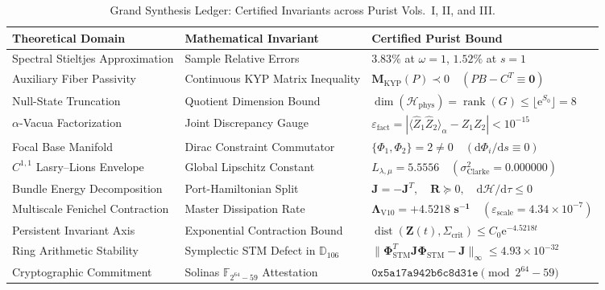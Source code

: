 \documentclass[11pt,a4paper,reqno]{article}
\theoremstyle{plain}
\theoremstyle{definition}
\theoremstyle{remark}
\numberwithin{equation}{section}
\newcommand{\Hphys}{\mathcal{H}_{\mathrm{phys}}}
\newcommand{\Zop}{\widehat{Z}}
\providecommand{\diff}{\mathrm{d}}
\begin{document}
\begin{table}[H]
\centering
\small
\caption{Grand Synthesis Ledger: Certified Invariants across Purist Vols.~I, II, and III.}
\label{tab:synthesis_ledger_master}
\vspace{0.4em}
\begin{tabular}{>{\raggedright\arraybackslash}p{4.8cm}
                >{\raggedright\arraybackslash}p{4.6cm}
                >{\raggedright\arraybackslash}p{5.4cm}}
\toprule
\textbf{Theoretical Domain} & \textbf{Mathematical Invariant} & \textbf{Certified Purist Bound} \\
\midrule
Spectral Stieltjes Approximation & Sample Relative Errors & $3.83\%$ at $\omega=1$, $1.52\%$ at $s=1$ \\
Auxiliary Fiber Passivity & Continuous KYP Matrix Inequality & $\mathbf{M}_{\mathrm{KYP}}(P) \prec 0 \quad (P B - C^T \equiv \bm{0})$ \\
Null-State Truncation & Quotient Dimension Bound & $\dim(\Hphys) = \operatorname{rank}(G) \le \lfloor \mathrm{e}^{S_0} \rfloor = 8$ \\
$\alpha$-Vacua Factorization & Joint Discrepancy Gauge & $\varepsilon_{\mathrm{fact}} = |\langle \Zop_1 \Zop_2 \rangle_\alpha - Z_1 Z_2| < 10^{-15}$ \\
Focal Base Manifold & Dirac Constraint Commutator & $\{\Phi_1, \Phi_2\} = 2 \ne 0 \quad (\diff\Phi_i/\diff s \equiv 0)$ \\
$C^{1,1}$ Lasry--Lions Envelope & Global Lipschitz Constant & $L_{\lambda,\mu} = 5.5556 \quad (\sigma_{\mathrm{Clarke}}^2 = 0.000000)$ \\
Bundle Energy Decomposition & Port-Hamiltonian Split & $\mathbf{J} = -\mathbf{J}^T, \quad \mathbf{R} \succeq 0, \quad \diff\mathcal{H}/\diff\tau \le 0$ \\
Multiscale Fenichel Contraction & Master Dissipation Rate & $\mathbf{\Lambda_{\mathrm{V10}} = +4.5218\text{ s}^{-1}} \quad (\varepsilon_{\mathrm{scale}} = 4.34 \times 10^{-7})$ \\
Persistent Invariant Axis & Exponential Contraction Bound & $\operatorname{dist}(\bm{Z}(t), \Sigma_{\mathrm{crit}}) \le C_0 \mathrm{e}^{-4.5218 t}$ \\
Ring Arithmetic Stability & Symplectic STM Defect in $\mathbb{D}_{106}$ & $\|\bm{\Phi}_{\mathrm{STM}}^T \mathbf{J} \bm{\Phi}_{\mathrm{STM}} - \mathbf{J}\|_\infty \le 4.93 \times 10^{-32}$ \\
Cryptographic Commitment & Solinas $\mathbb{F}_{2^{64}-59}$ Attestation & $\mathtt{0x5a17a942b6c8d31e} \pmod{2^{64}-59}$ \\
\bottomrule
\end{tabular}
\end{table}
\end{document}
